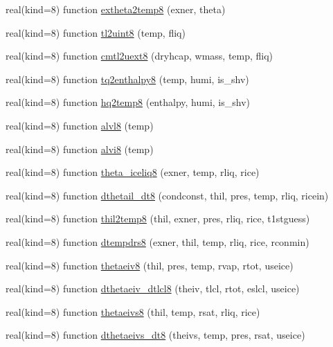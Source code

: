 \begin{DoxyCompactItemize}
real(kind=8) function \hyperlink{namespacetherm__lib8_ac210423ab55881e57a525b8f13593fa3}{extheta2temp8} (exner, theta)
\item 
real(kind=8) function \hyperlink{namespacetherm__lib8_afb21e6b55b53bbc124c228e01ccc60cb}{tl2uint8} (temp, fliq)
\item 
real(kind=8) function \hyperlink{namespacetherm__lib8_af5c7259346e1ee029458410d49100d77}{cmtl2uext8} (dryhcap, wmass, temp, fliq)
\item 
real(kind=8) function \hyperlink{namespacetherm__lib8_abc11d3a9518a513fd0b3b97e6fc0e68e}{tq2enthalpy8} (temp, humi, is\+\_\+shv)
\item 
real(kind=8) function \hyperlink{namespacetherm__lib8_a1ffd2b0e4437b77b168fa1df97e641ca}{hq2temp8} (enthalpy, humi, is\+\_\+shv)
\item 
real(kind=8) function \hyperlink{namespacetherm__lib8_a8dfe9d6c06c19f28e388354ce1001ec2}{alvl8} (temp)
\item 
real(kind=8) function \hyperlink{namespacetherm__lib8_a3b1992f0fffee3a316b79819cac27382}{alvi8} (temp)
\item 
real(kind=8) function \hyperlink{namespacetherm__lib8_a7d5573528d5f5adeb9beb594eead7f4f}{theta\+\_\+iceliq8} (exner, temp, rliq, rice)
\item 
real(kind=8) function \hyperlink{namespacetherm__lib8_acd882aa1f52e8cbaee8065ca35eb5867}{dthetail\+\_\+dt8} (condconst, thil, pres, temp, rliq, ricein)
\item 
real(kind=8) function \hyperlink{namespacetherm__lib8_a7d009d0d3507e656b58c9eb70c747598}{thil2temp8} (thil, exner, pres, rliq, rice, t1stguess)
\item 
real(kind=8) function \hyperlink{namespacetherm__lib8_af3b110a715728849ed26074d4675f0e8}{dtempdrs8} (exner, thil, temp, rliq, rice, rconmin)
\item 
real(kind=8) function \hyperlink{namespacetherm__lib8_aca0eeff24415eab272c13efcba42ebd5}{thetaeiv8} (thil, pres, temp, rvap, rtot, useice)
\item 
real(kind=8) function \hyperlink{namespacetherm__lib8_ac2831ca558c25b3522c21e3cab5ce230}{dthetaeiv\+\_\+dtlcl8} (theiv, tlcl, rtot, eslcl, useice)
\item 
real(kind=8) function \hyperlink{namespacetherm__lib8_a43786e4d4bcf61f6d8fb66fa5a925df9}{thetaeivs8} (thil, temp, rsat, rliq, rice)
\item 
real(kind=8) function \hyperlink{namespacetherm__lib8_a6f2144435a34b9e51e60dcab30877216}{dthetaeivs\+\_\+dt8} (theivs, temp, pres, rsat, useice)

\end{DoxyCompactItemize}
